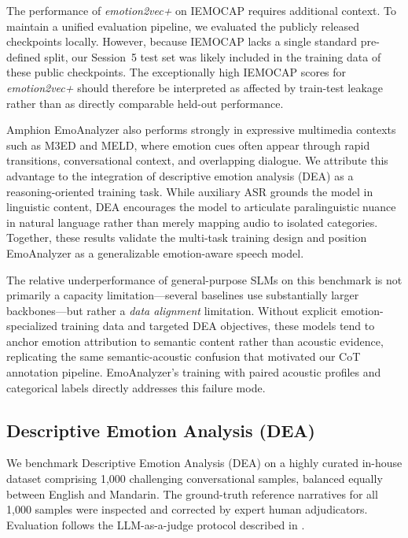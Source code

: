 The performance of \textit{emotion2vec+} on IEMOCAP requires additional context. To maintain a unified evaluation pipeline, we evaluated the publicly released checkpoints locally. However, because IEMOCAP lacks a single standard pre-defined split, our Session~5 test set was likely included in the training data of these public checkpoints. The exceptionally high IEMOCAP scores for \textit{emotion2vec+} should therefore be interpreted as affected by train-test leakage rather than as directly comparable held-out performance.

Amphion EmoAnalyzer also performs strongly in expressive multimedia contexts such as M3ED and MELD, where emotion cues often appear through rapid transitions, conversational context, and overlapping dialogue. We attribute this advantage to the integration of descriptive emotion analysis (DEA) as a reasoning-oriented training task. While auxiliary ASR grounds the model in linguistic content, DEA encourages the model to articulate paralinguistic nuance in natural language rather than merely mapping audio to isolated categories. Together, these results validate the multi-task training design and position EmoAnalyzer as a generalizable emotion-aware speech model.

The relative underperformance of general-purpose SLMs on this benchmark is not primarily a capacity limitation---several baselines use substantially larger backbones---but rather a \textit{data alignment} limitation. Without explicit emotion-specialized training data and targeted DEA objectives, these models tend to anchor emotion attribution to semantic content rather than acoustic evidence, replicating the same semantic-acoustic confusion that motivated our CoT annotation pipeline. EmoAnalyzer's training with paired acoustic profiles and categorical labels directly addresses this failure mode.


\subsection{Descriptive Emotion Analysis (DEA)}

We benchmark Descriptive Emotion Analysis (DEA) on a highly curated in-house dataset comprising 1,000 challenging conversational samples, balanced equally between English and Mandarin. The ground-truth reference narratives for all 1,000 samples were inspected and corrected by expert human adjudicators. Evaluation follows the LLM-as-a-judge protocol described in .



